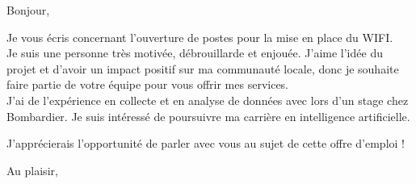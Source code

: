 \documentclass[12pt,french]{letter}
\begin{document}
\pagestyle{headings}

\begin{letter}{}
\address{Montréal, Canada}

\opening{Bonjour,}


Je vous écris concernant l'ouverture de postes pour la mise en place du WIFI.\\
Je suis une personne très motivée, débrouillarde et enjouée. J'aime l'idée du projet et d'avoir un impact positif sur ma communauté locale, donc je souhaite faire partie de votre équipe pour vous offrir mes services.   \\
J'ai de l'expérience en collecte et en analyse de données avec lors d'un stage chez Bombardier.  Je suis intéressé de poursuivre ma carrière en intelligence artificielle.

J'apprécierais l'opportunité de parler avec vous au sujet de cette offre d'emploi !
\signature{Maxime}

\closing{Au plaisir,}


\end{letter}
\end{document}

